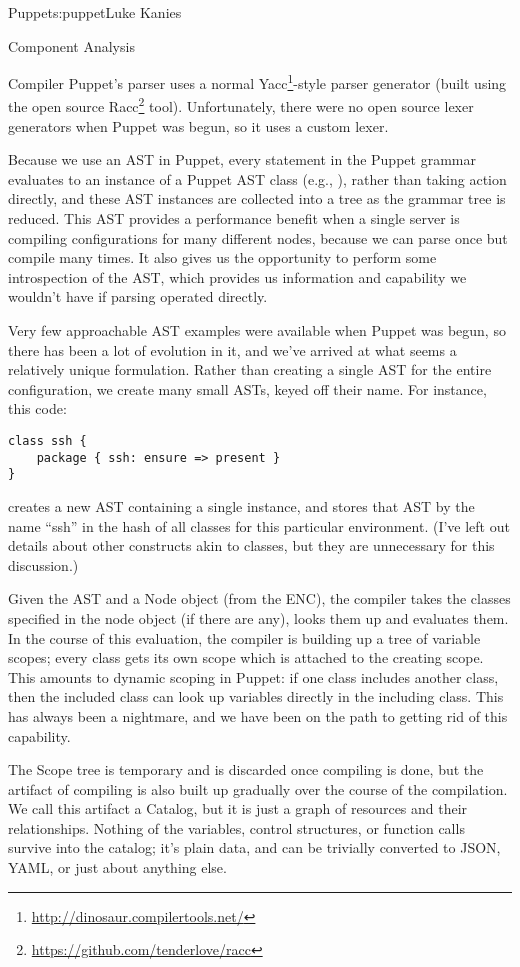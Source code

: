 \begin{aosachapter}{Puppet}{s:puppet}{Luke Kanies}
\begin{aosasect1}{Component Analysis}
\begin{aosasect2}{Compiler}
Puppet's parser uses a normal
Yacc\footnote{\url{http://dinosaur.compilertools.net/}}-style parser
generator (built using the open source
Racc\footnote{\url{https://github.com/tenderlove/racc}}
tool). Unfortunately, there were no open source lexer generators when
Puppet was begun, so it uses a custom lexer.

Because we use an AST in Puppet, every statement in the Puppet grammar
evaluates to an instance of a Puppet AST class (e.g.,
), rather than taking action directly,
and these AST instances are collected into a tree as the grammar tree
is reduced.  This AST provides a performance benefit when a single
server is compiling configurations for many different nodes, because
we can parse once but compile many times.  It also gives us the
opportunity to perform some introspection of the AST, which provides
us information and capability we wouldn't have if parsing operated
directly.

Very few approachable AST examples were available when Puppet was
begun, so there has been a lot of evolution in it, and we've 
arrived at what seems a relatively unique formulation.  Rather than
creating a single AST for the entire configuration, we create many
small ASTs, keyed off their name.  For instance, this code:

\begin{verbatim}
class ssh {
    package { ssh: ensure => present }
}
\end{verbatim}

\noindent creates a new AST containing a single 
instance, and stores that AST by the name ``ssh'' in the hash of all
classes for this particular environment.  (I've left out details about
other constructs akin to classes, but they are unnecessary for this
discussion.)

Given the AST and a Node object (from the ENC), the compiler takes the
classes specified in the node object (if there are any), looks them
up and evaluates them.  In the course of this evaluation, the
compiler is building up a tree of variable scopes; every class gets
its own scope which is attached to the creating scope.  This amounts
to dynamic scoping in Puppet: if one class includes another class,
then the included class can look up variables directly in the
including class. This has always been a nightmare, and we have been on
the path to getting rid of this capability.

The Scope tree is temporary and is discarded once compiling is done,
but the artifact of compiling is also built up gradually over the
course of the compilation.  We call this artifact a Catalog, but it is
just a graph of resources and their relationships.  Nothing of the
variables, control structures, or function calls survive into the
catalog; it's plain data, and can be trivially converted to JSON,
YAML, or just about anything else.


\end{aosasect2}
\end{aosasect1}
\end{aosachapter}
